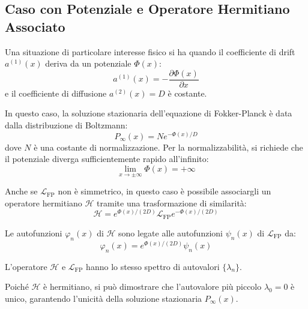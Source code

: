 \subsection{Caso con Potenziale e Operatore Hermitiano Associato}
Una situazione di particolare interesse fisico si ha quando il coefficiente di drift $a^{(1)}(x)$ deriva da un potenziale $\Phi(x)$:
\begin{equation}
a^{(1)}(x)=-\frac{\partial\Phi(x)}{\partial x}
\end{equation}
e il coefficiente di diffusione $a^{(2)}(x)=D$ è costante.

In questo caso, la soluzione stazionaria dell'equazione di Fokker-Planck è data dalla distribuzione di Boltzmann:
\begin{equation}
P_{\infty}(x)=N e^{-\Phi(x)/D}
\end{equation}
dove $N$ è una costante di normalizzazione. Per la normalizzabilità, si richiede che il potenziale diverga sufficientemente rapido all'infinito:
\begin{equation}
\lim_{x\rightarrow\pm\infty}\Phi(x)=+\infty
\end{equation}

Anche se $\mathcal{L}_{\text{FP}}$ non è simmetrico, in questo caso è possibile associargli un operatore hermitiano $\mathcal{H}$ tramite una trasformazione di similarità:
\begin{equation}
\mathcal{H} = e^{\Phi(x)/(2D)} \mathcal{L}_{\text{FP}} e^{-\Phi(x)/(2D)}
\end{equation}

Le autofunzioni $\varphi_n(x)$ di $\mathcal{H}$ sono legate alle autofunzioni $\psi_n(x)$ di $\mathcal{L}_{\text{FP}}$ da:
\begin{equation}
\varphi_{n}(x)=e^{\Phi(x)/(2D)} \psi_{n}(x)
\end{equation}

L'operatore $\mathcal{H}$ e $\mathcal{L}_{\text{FP}}$ hanno lo stesso spettro di autovalori $\{\lambda_n\}$.

\begin{tcolorbox}[
    colback=colorD!5,      
    colframe=colorD,       
    title={Proprietà},
    fonttitle=\bfseries\sffamily,
    arc=3mm,               
    boxrule=1.2pt,         
    halign title=flush left
]
Poiché $\mathcal{H}$ è hermitiano, si può dimostrare che l'autovalore più piccolo $\lambda_0=0$ è unico, garantendo l'unicità della soluzione stazionaria $P_\infty(x)$.
\end{tcolorbox}

